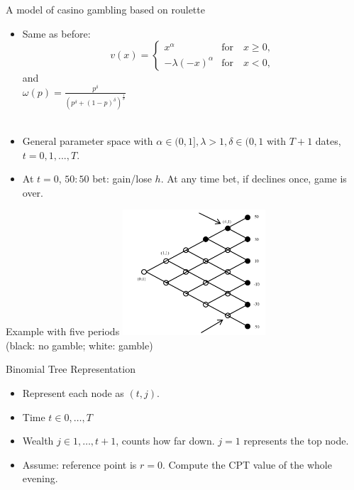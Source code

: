 \begin{frame}{A model of casino gambling based on roulette}
    \begin{itemize}
    \item Same as before:\medskip
        \[
        v(x) = \begin{cases}
            x^\alpha  &  \text{for} \quad x \geq 0,\\
            -\lambda (-x)^\alpha & \text{for} \quad x<0,
            \end{cases}
        \]\medskip
        and \\
        {\centering $ \omega(p)=\frac{p^\delta }{(p^\delta + (1-p)^\delta)^{\frac{1}{\delta}}} $\\

        }
        \hspace*{\fill} \\
    \item General parameter space  with $\alpha \in (0,1], \lambda>1,  \delta \in (0,1 $ with $T+1$ dates, $t=0,1,...,T.$ \medskip
    \item At $t=0$, $50:50$ bet: gain/lose $h$. At any time bet, if declines once, game is over.\medskip
    \end{itemize}
\end{frame}

\begin{frame}{Example with five periods}
\centering
        \includegraphics[width = 0.4\textwidth]{fig2.png}\\
    (black: no gamble; white: gamble)
    \end{frame}

\begin{frame}{Binomial Tree Representation}
    \begin{itemize}
        \item Represent each node as $(t, j)$.\bigskip
        \item Time $t \in {0,\ldots ,T}$ \bigskip
        \item Wealth $ j \in {1,\ldots, t+1}$, counts how far down. $j=1$ represents the top node.\bigskip
        \item Assume: reference point is $r=0$. Compute the CPT value of the whole evening.\bigskip
    \end{itemize}
\end{frame}


